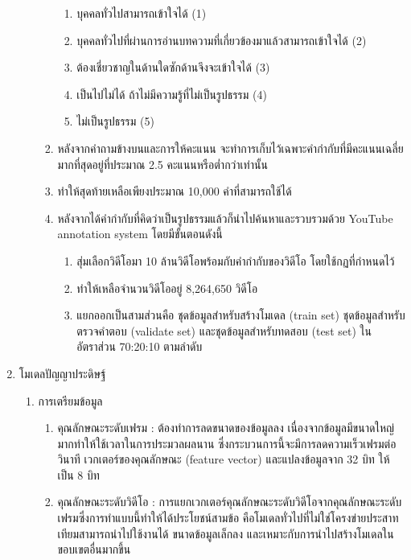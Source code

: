 \begin{enumerate}
\begin{enumerate}
\begin{enumerate}
\begin{enumerate}
				\setlength\itemsep{-0.25em}
				\item บุคคลทั่วไปสามารถเข้าใจได้ (1)
				\item บุคคลทั่วไปที่ผ่านการอ่านบทความที่เกี่ยวข้องมาแล้วสามารถเข้าใจได้ (2)
				\item ต้องเชี่ยวชาญในด้านใดซักด้านจึงจะเข้าใจได้ (3)
				\item เป็นไปไม่ได้ ถ้าไม่มีความรู้ที่ไม่เป็นรูปธรรม (4)
				\item ไม่เป็นรูปธรรม (5)
			\end{enumerate}
			\item หลังจากคำถามข้างบนและการให้คะแนน จะทำการเก็บไว้เฉพาะคำกำกับที่มีคะแนนเฉลี่ยมากที่สุดอยู่ที่ประมาณ 2.5 คะแนนหรือต่ำกว่าเท่านั้น
			\item ทำให้สุดท้ายเหลือเพียงประมาณ 10,000 คำที่สามารถใช้ได้
			\item หลังจากได้คำกำกับที่คิดว่าเป็นรูปธรรมแล้วก็นำไปค้นหาและรวบรวมด้วย YouTube annotation system โดยมีขั้นตอนดังนี้										
			\begin{enumerate}
				\setlength\itemsep{-0.25em}
				\item สุ่มเลือกวิดีโอมา 10 ล้านวิดีโอพร้อมกับคำกำกับของวิดีโอ โดยใช้กฏที่กำหนดไว้
				\item ทำให้เหลือจำนวนวิดีโออยู่ 8,264,650 วิดีโอ
				\item แยกออกเป็นสามส่วนคือ ชุดข้อมูลสำหรับสร้างโมเดล (train set) ชุดข้อมูลสำหรับตรวจคำตอบ (validate set) และชุดข้อมูลสำหรับทดสอบ (test set) ในอัตราส่วน 70:20:10 ตามลำดับ
			\end{enumerate}
		\end{enumerate}
	\end{enumerate}
	\item {โมเดลปัญญาประดิษฐ์}
	\begin{enumerate}
		\setlength\itemsep{-0.25em}
		\item การเตรียมข้อมูล
			\begin{enumerate}  
				\item คุณลักษณะระดับเฟรม : ต้องทำการลดขนาดของข้อมูลลง เนื่องจากข้อมูลมีขนาดใหญ่มากทำให้ใช้เวลาในการประมวลผลนาน ซึ่งกระบวนการนี้จะมีการลดความเร็วเฟรมต่อวินาที 
				เวกเตอร์ของคุณลักษณะ (feature vector) และแปลงข้อมูลจาก 32 บิท ให้เป็น 8 บิท
				\item คุณลักษณะระดับวิดีโอ : การแยกเวกเตอร์คุณลักษณะระดับวิดีโอจากคุณลักษณะระดับเฟรมซึ่งการทำแบบนี้ทำให้ได้ประโยชน์สามข้อ 
				คือโมเดลทั่วไปที่ไม่ใช่โครงข่ายประสาทเทียมสามารถนำไปใช้งานได้ ขนาดข้อมูลเล็กลง และเหมาะกับการนำไปสร้างโมเดลในขอบเขตอื่นมากขึ้น
			\end{enumerate}	

\end{enumerate}
\end{enumerate}
